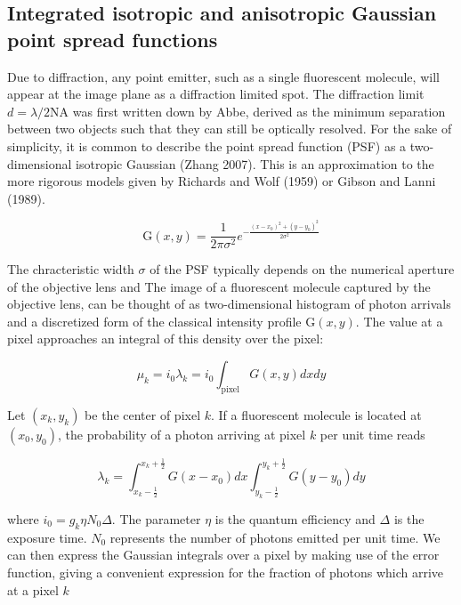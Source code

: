 \documentclass{ucetd}
\begin{document}
\subsection{Integrated isotropic and anisotropic Gaussian point spread functions}


Due to diffraction, any point emitter, such as a single fluorescent molecule, will appear at the image plane as a diffraction limited spot. The diffraction limit $d = \lambda / 2\mathrm{NA}$ was first written down by Abbe, derived as the minimum separation between two objects such that they can still be optically resolved. For the sake of simplicity, it is common to describe the point spread function (PSF) as a two-dimensional isotropic Gaussian (Zhang 2007). This is an approximation to the more rigorous models given by Richards and Wolf (1959) or Gibson and Lanni (1989). 

\begin{equation*}
\mathrm{G}(x,y) = \frac{1}{2\pi\sigma^{2}}e^{-\frac{(x-x_{0})^{2}+(y-y_{0})^{2}}{2\sigma^{2}}}
\end{equation*}

The chracteristic width $\sigma$ of the PSF typically depends on the numerical aperture of the objective lens and The image of a fluorescent molecule captured by the objective lens, can be thought of as two-dimensional histogram of photon arrivals and a discretized form of the classical intensity profile $\mathrm{G}(x,y)$. The value at a pixel approaches an integral of this density over the pixel:

\begin{equation}
\mu_{k} = i_{0}\lambda_{k} = i_{0}\int_{\mathrm{pixel}} G(x,y)dxdy
\end{equation}


Let $(x_{k},y_{k})$ be the center of pixel $k$. If a fluorescent molecule is located at $(x_{0},y_{0})$, the probability of a photon arriving at pixel $k$ per unit time reads

\begin{equation*}
\lambda_{k} = \int_{x_{k}-\frac{1}{2}}^{x_{k}+\frac{1}{2}}G(x-x_{0})dx \int_{y_{k}-\frac{1}{2}}^{y_{k}+\frac{1}{2}} G(y-y_{0})dy
\end{equation*}

where $i_{0} = g_{k}\eta N_{0}\Delta$. The parameter $\eta$ is the quantum efficiency and $\Delta$ is the exposure time. $N_{0}$ represents the number of photons emitted per unit time. We can then express the Gaussian integrals over a pixel by making use of the error function, giving a convenient expression for the fraction of photons which arrive at a pixel $k$
\end{document}

